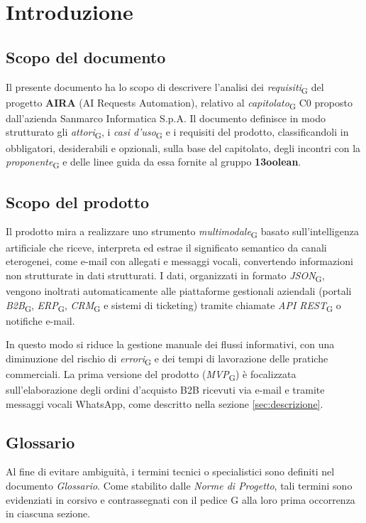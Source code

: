 \section{Introduzione}
\subsection{Scopo del documento}
Il presente documento ha lo scopo di descrivere l'analisi dei \textit{requisiti}\textsubscript{G} del progetto \textbf{AIRA} (AI Requests Automation), relativo al \textit{capitolato}\textsubscript{G} C0 proposto dall'azienda Sanmarco Informatica S.p.A. Il documento definisce in modo strutturato gli \textit{attori}\textsubscript{G}, i \textit{casi d'uso}\textsubscript{G} e i requisiti del prodotto, classificandoli in obbligatori, desiderabili e opzionali, sulla base del capitolato, degli incontri con la \textit{proponente}\textsubscript{G} e delle linee guida da essa fornite al gruppo \textbf{13oolean}.

\subsection{Scopo del prodotto}
Il prodotto mira a realizzare uno strumento \textit{multimodale}\textsubscript{G} basato sull'intelligenza artificiale che riceve, interpreta ed estrae il significato semantico da canali eterogenei, come e-mail con allegati e messaggi vocali, convertendo informazioni non strutturate in dati strutturati. I dati, organizzati in formato \textit{JSON}\textsubscript{G}, vengono inoltrati automaticamente alle piattaforme gestionali aziendali (portali \textit{B2B}\textsubscript{G}, \textit{ERP}\textsubscript{G}, \textit{CRM}\textsubscript{G} e sistemi di ticketing) tramite chiamate \textit{API REST}\textsubscript{G} o notifiche e-mail.

In questo modo si riduce la gestione manuale dei flussi informativi, con una diminuzione del rischio di \textit{errori}\textsubscript{G} e dei tempi di lavorazione delle pratiche commerciali. La prima versione del prodotto (\textit{MVP}\textsubscript{G}) è focalizzata sull'elaborazione degli ordini d'acquisto B2B ricevuti via e-mail e tramite messaggi vocali WhatsApp, come descritto nella sezione \ref{sec:descrizione}.

\subsection{Glossario}
Al fine di evitare ambiguità, i termini tecnici o specialistici sono definiti nel documento \textit{Glossario}. Come stabilito dalle \textit{Norme di Progetto}, tali termini sono evidenziati in corsivo e contrassegnati con il pedice G alla loro prima occorrenza in ciascuna sezione.


